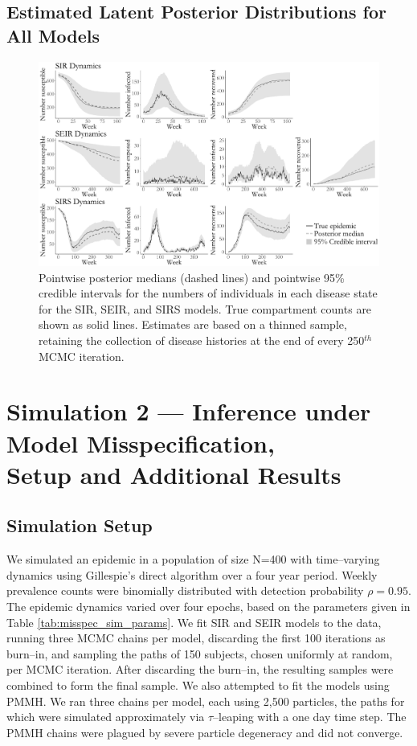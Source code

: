 \subsection{Estimated Latent Posterior Distributions for All Models}
\begin{figure}[htbp]
	\centering
	\includegraphics[width=\linewidth]{figures/sim1_latent_posts_all.pdf}
	\caption[Simulation 1 latent posterior distributions for all models.]{Pointwise posterior medians (dashed lines) and pointwise 95\% credible intervals for the numbers of individuals in each disease state for the SIR, SEIR, and SIRS models. True compartment counts are shown as solid lines. Estimates are based on a thinned sample, retaining the collection of disease histories at the end of every 250$ ^{th} $ MCMC iteration.}
	\label{fig:sim1_latent_post_all}
\end{figure}

\newpage
\section{Simulation 2 --- Inference under Model Misspecification,\\ Setup and Additional Results}
\label{sec:bda_misspec_sim_details}
\subsection{Simulation Setup}
We simulated an epidemic in a population of size N=400 with time--varying dynamics using Gillespie's direct algorithm over a four year period. Weekly prevalence counts were binomially distributed with detection probability $ \rho = 0.95 $. The epidemic dynamics varied over four epochs, based on the parameters given in Table \ref{tab:misspec_sim_params}. We fit SIR and SEIR models to the data, running three MCMC chains per model, discarding the first 100 iterations as burn--in, and sampling the paths of 150 subjects, chosen uniformly at random, per MCMC iteration. After discarding the burn--in, the resulting samples were combined to form the final sample. We also attempted to fit the models using PMMH. We ran three chains per model, each using 2,500 particles, the paths for which were simulated approximately via $ \tau$--leaping with a one day time step. The PMMH chains were plagued by severe particle degeneracy and did not converge.

